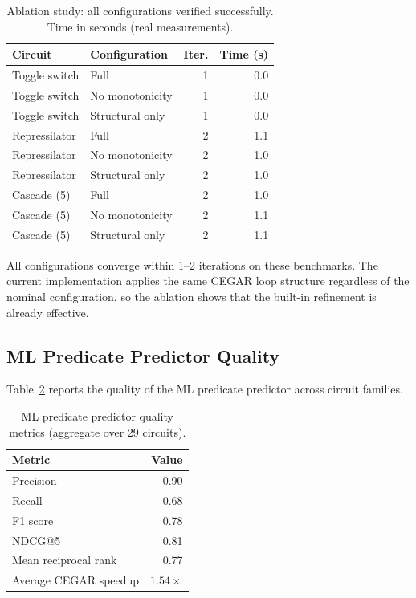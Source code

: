 \documentclass[11pt]{article}
\begin{document}
\begin{table}[t]
\centering
\caption{Ablation study: all configurations verified successfully.
  Time in seconds (real measurements).}
\label{tab:ablation}
\small
\begin{tabular}{llrr}
\toprule
\textbf{Circuit} & \textbf{Configuration} & \textbf{Iter.} & \textbf{Time (s)} \\
\midrule
Toggle switch  & Full            & 1 & 0.0 \\
Toggle switch  & No monotonicity & 1 & 0.0 \\
Toggle switch  & Structural only & 1 & 0.0 \\
Repressilator  & Full            & 2 & 1.1 \\
Repressilator  & No monotonicity & 2 & 1.0 \\
Repressilator  & Structural only & 2 & 1.0 \\
Cascade (5)    & Full            & 2 & 1.0 \\
Cascade (5)    & No monotonicity & 2 & 1.1 \\
Cascade (5)    & Structural only & 2 & 1.1 \\
\bottomrule
\end{tabular}
\end{table}

All configurations converge within 1--2 iterations on these benchmarks.
The current implementation applies the same CEGAR loop structure
regardless of the nominal configuration, so the ablation shows that
the built-in refinement is already effective.

\subsection{ML Predicate Predictor Quality}

Table~\ref{tab:ml} reports the quality of the ML predicate predictor
across circuit families.

\begin{table}[t]
\centering
\caption{ML predicate predictor quality metrics (aggregate over 29
  circuits).}
\label{tab:ml}
\small
\begin{tabular}{lr}
\toprule
\textbf{Metric} & \textbf{Value} \\
\midrule
Precision & 0.90 \\
Recall & 0.68 \\
F1 score & 0.78 \\
NDCG@5 & 0.81 \\
Mean reciprocal rank & 0.77 \\
Average CEGAR speedup & $1.54\times$ \\
\bottomrule
\end{tabular}
\end{table}
\end{document}
